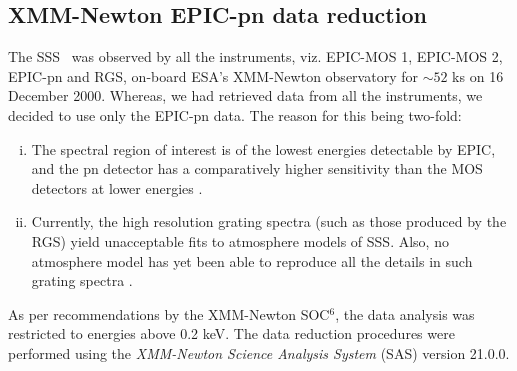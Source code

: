     \subsection{XMM-Newton EPIC-pn data reduction}
    	The SSS \source\ was observed by all the instruments, viz. EPIC-MOS 1, EPIC-MOS 2, EPIC-pn and RGS, on-board ESA's XMM-Newton observatory for $\sim 52$ ks on 16 December 2000. Whereas, we had retrieved data from all the instruments, we decided to use only the EPIC-pn data. The reason for this being two-fold:
    	\begin{enumerate}[i.]
    		\item The spectral region of interest is of the lowest energies detectable by EPIC, and the pn detector has a comparatively higher sensitivity than the MOS detectors at lower energies \cite{stecchini2023revisiting,mateos2009statistical}.
    		\item Currently, the high resolution grating spectra (such as those produced by the RGS) yield unacceptable fits to atmosphere models of SSS. Also, no atmosphere model has yet been able to reproduce all the details in such grating spectra \cite{ness2020complications}.
    	\end{enumerate}
    	As per recommendations by the XMM-Newton SOC$^6$, the data analysis was restricted to energies above 0.2 keV. The data reduction procedures were performed using the \textit{XMM-Newton Science Analysis System} (SAS) version 21.0.0.
    
